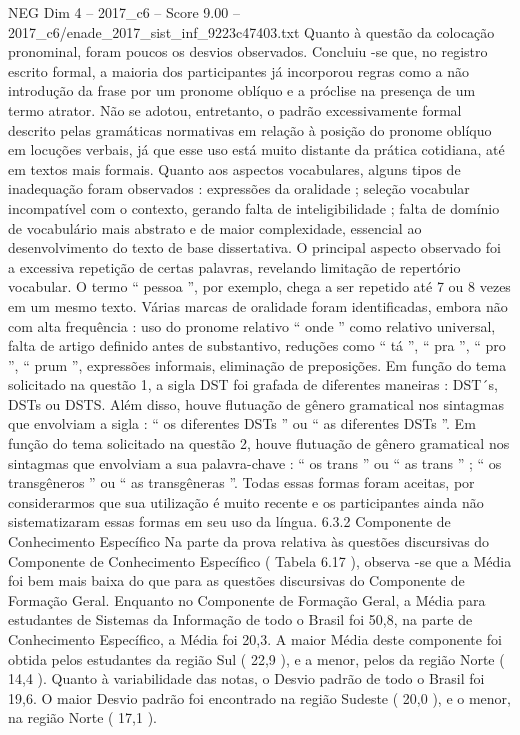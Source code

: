 \begin{textsample}{NEG Dim 4 – 2017\_c6 – Score 9.00 – 2017\_c6/enade\_2017\_sist\_inf\_9223c47403.txt}
Quanto à questão da colocação pronominal, foram poucos os desvios observados.
Concluiu -se que, no registro escrito formal, a maioria dos participantes já incorporou regras como a não introdução da frase por um pronome oblíquo e a próclise na presença de um termo atrator.
Não se adotou, entretanto, o padrão excessivamente formal descrito pelas gramáticas normativas em relação à posição do pronome oblíquo em locuções verbais, já que esse uso está muito distante da prática cotidiana, até em textos mais formais.
Quanto aos aspectos vocabulares, alguns tipos de inadequação foram observados : expressões da oralidade ; seleção vocabular incompatível com o contexto, gerando falta de inteligibilidade ; falta de domínio de vocabulário mais abstrato e de maior complexidade, essencial ao desenvolvimento do texto de base dissertativa.
O principal aspecto observado foi a excessiva repetição de certas palavras, revelando limitação de repertório vocabular.
O termo “ pessoa ”, por exemplo, chega a ser repetido até 7 ou 8 vezes em um mesmo texto.
Várias marcas de oralidade foram identificadas, embora não com alta frequência : uso do pronome relativo “ onde ” como relativo universal, falta de artigo definido antes de substantivo, reduções como “ tá ”, “ pra ”, “ pro ”, “ prum ”, expressões informais, eliminação de preposições.
Em função do tema solicitado na questão 1, a sigla DST foi grafada de diferentes maneiras : DST´s, DSTs ou DSTS.
Além disso, houve flutuação de gênero gramatical nos sintagmas que envolviam a sigla : “ os diferentes DSTs ” ou “ as diferentes DSTs ”.
Em função do tema solicitado na questão 2, houve flutuação de gênero gramatical nos sintagmas que envolviam a sua palavra-chave : “ os trans ” ou “ as trans ” ; “ os transgêneros ” ou “ as transgêneras ”.
Todas essas formas foram aceitas, por considerarmos que sua utilização é muito recente e os participantes ainda não sistematizaram essas formas em seu uso da língua. 6.3.2 Componente de Conhecimento Específico Na parte da prova relativa às questões discursivas do Componente de Conhecimento Específico ( Tabela 6.17 ), observa -se que a Média foi bem mais baixa do que para as questões discursivas do Componente de Formação Geral.
Enquanto no Componente de Formação Geral, a Média para estudantes de Sistemas da Informação de todo o Brasil foi 50,8, na parte de Conhecimento Específico, a Média foi 20,3.
A maior Média deste componente foi obtida pelos estudantes da região Sul ( 22,9 ), e a menor, pelos da região Norte ( 14,4 ).
Quanto à variabilidade das notas, o Desvio padrão de todo o Brasil foi 19,6.
O maior Desvio padrão foi encontrado na região Sudeste ( 20,0 ), e o menor, na região Norte ( 17,1 ).

\end{textsample}
